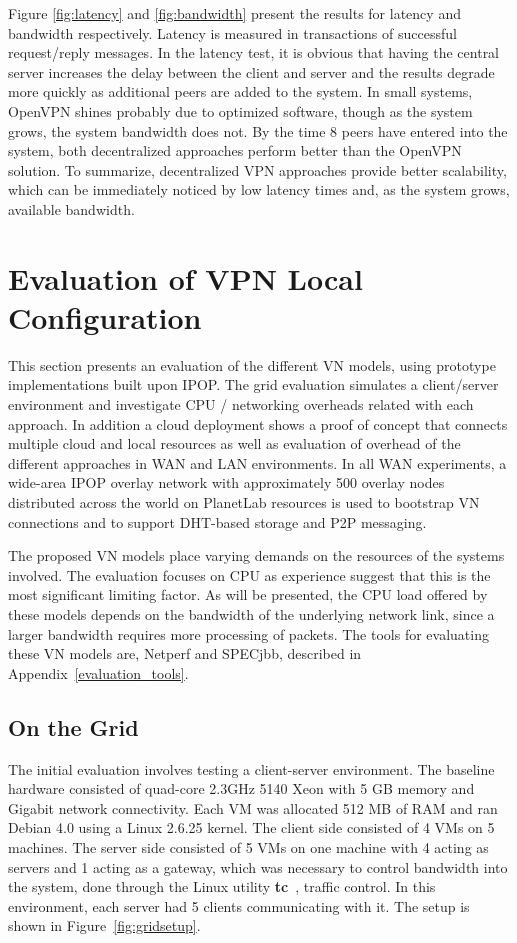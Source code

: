 Figure \ref{fig:latency} and \ref{fig:bandwidth} present the results for latency
and bandwidth respectively.  Latency is measured in transactions of successful
request/reply messages.  In the latency test, it is obvious that having the
central server increases the delay between the client and server and the results
degrade more quickly as additional peers are added to the system.  In small
systems, OpenVPN shines probably due to optimized software, though as the system
grows, the system bandwidth does not.  By the time 8 peers have entered into
the system, both decentralized approaches perform better than the OpenVPN
solution.  To summarize, decentralized VPN approaches provide better
scalability, which can be immediately noticed by low latency times and, as the
system grows, available bandwidth.

\section{Evaluation of VPN Local Configuration}
This section presents an evaluation of the different VN models, using prototype
implementations built upon IPOP.  The grid evaluation simulates a client/server
environment and investigate CPU / networking overheads related with each
approach.  In addition a cloud deployment shows a proof of concept that connects
multiple cloud and local resources as well as evaluation of overhead of the
different approaches in WAN and LAN environments.  In all WAN experiments, a
wide-area IPOP overlay network with approximately 500 overlay nodes distributed
across the world on PlanetLab resources is used to bootstrap VN connections and
to support DHT-based storage and P2P messaging.

The proposed VN models place varying demands on the resources of the systems
involved. The evaluation focuses on CPU as experience suggest that this is the
most significant limiting factor.  As will be presented, the CPU load offered
by these models depends on the bandwidth of the underlying network link, since
a larger bandwidth requires more processing of packets.  The tools for
evaluating these VN models are, Netperf and SPECjbb, described in
Appendix~\ref{evaluation_tools}.

\subsection{On the Grid}
The initial evaluation involves testing a client-server environment.  The
baseline hardware consisted of quad-core 2.3GHz 5140 Xeon with 5 GB memory and
Gigabit network connectivity.  Each VM was allocated 512 MB of RAM and ran
Debian 4.0 using a Linux 2.6.25 kernel.  The client side consisted of 4 VMs on
5 machines.  The server side consisted of 5 VMs on one machine with 4 acting
as servers and 1 acting as a gateway, which was necessary to control bandwidth
into the system, done through the Linux utility \textbf{tc}~\cite{tc}, traffic
control.  In this environment, each server had 5 clients communicating with it.
The setup is shown in Figure~\ref{fig:gridsetup}.

